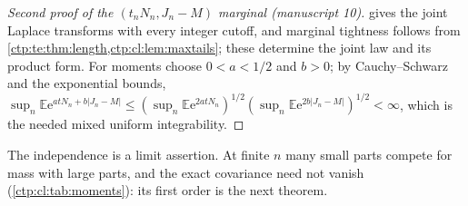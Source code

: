 \documentclass[11pt,a4paper]{article}
\numberwithin{equation}{section}
\theoremstyle{definition}
\theoremstyle{remark}
\newcommand{\e}{\mathrm e}
\newcommand{\E}{\mathbb E}
\begin{document}
\begin{proof}[Second proof of the $(t_nN_n,J_n-M)$ marginal (manuscript 10)]
 gives the joint Laplace transforms with every
integer cutoff, and marginal tightness follows from
\cref{ctp:te:thm:length,ctp:cl:lem:maxtails}; these determine the joint law
and its product form. For moments choose $0<a<1/2$ and $b>0$; by
Cauchy--Schwarz and the exponential bounds,
$\sup_n\E\e^{atN_n+b|J_n-M|}\le(\sup_n\E\e^{2atN_n})^{1/2}(\sup_n\E\e^{2b|J_n-M|})^{1/2}<\infty$,
which is the needed mixed uniform integrability.
\end{proof}

The independence is a limit assertion. At finite $n$ many small parts
compete for mass with large parts, and the exact covariance need not vanish
(\cref{ctp:cl:tab:moments}): its first order is the next theorem.
\end{document}
